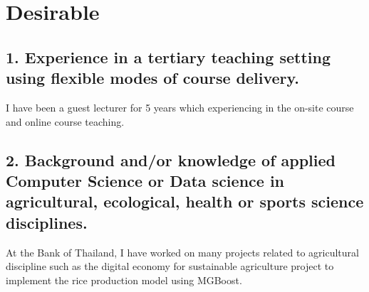 \documentclass[12pt]{article}
\begin{document}
\section*{Desirable}

\subsection*{1. Experience in a tertiary teaching setting using flexible modes of course delivery.}
{\bfseries} I have been a guest lecturer for 5 years which experiencing in the on-site course and online course teaching.

\subsection*{2. Background and/or knowledge of applied Computer Science or Data science in agricultural, ecological, health or sports science disciplines.}
{\bfseries} At the Bank of Thailand, I have worked on many projects related to agricultural discipline such as the digital economy for sustainable agriculture project to implement the rice production model using MGBoost.
\end{document}
